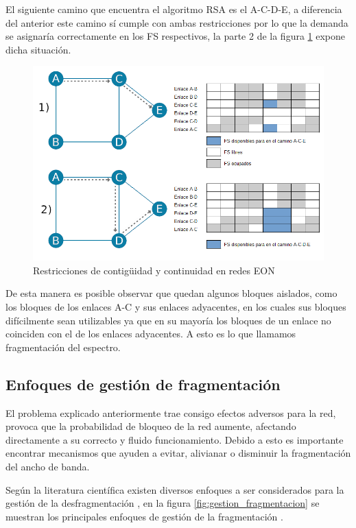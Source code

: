 El siguiente camino que encuentra el algoritmo RSA es el A-C-D-E, a diferencia del anterior este camino sí cumple con ambas restricciones por lo que la demanda se asignaría correctamente en los FS respectivos, la parte 2 de la figura \ref{fig:fragmentacion} expone dicha situación.
\begin{figure}
    \centering
    \includegraphics[width=1\textwidth]{capitulos/img/fragmentacion.png}
    \caption{Restricciones de contigüidad y continuidad en redes EON}
    \label{fig:fragmentacion}
\end{figure}

De esta manera es posible observar que quedan algunos bloques aislados, como los bloques de los enlaces A-C y sus enlaces adyacentes, en los cuales sus bloques difícilmente  sean utilizables ya que en su mayoría los bloques de un enlace no coinciden con el de los enlaces adyacentes. A esto es lo que llamamos fragmentación del espectro. 

\subsection{Enfoques de gestión de fragmentación}
El problema explicado anteriormente trae consigo efectos adversos para la red, provoca que la probabilidad de bloqueo de la red aumente, afectando directamente a su correcto y fluido funcionamiento. Debido a esto es importante encontrar mecanismos que ayuden a evitar, alivianar o disminuir la fragmentación del ancho de banda. 

Según la literatura científica existen diversos enfoques a ser considerados para la gestión de la desfragmentación , en la figura \ref{fig:gestion_fragmentacion} se muestran los principales enfoques de gestión de la fragmentación \cite{chatterjee2017fragmentation}.

